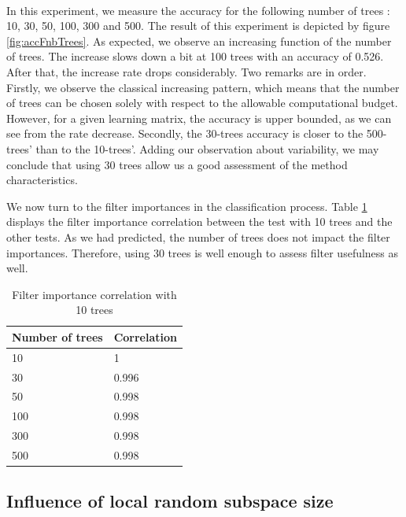 \documentclass[a4paper]{report}
\begin{document}
		\paragraph{}
		In this experiment, we measure the accuracy for the following number of trees : 10, 30, 50, 100, 300 and 500. 
		The result of this experiment is depicted by figure \ref{fig:accFnbTrees}. As expected, we observe an increasing function of the number of trees. The increase slows down a bit at 100 trees with an accuracy of 0.526. After that, the increase rate drops considerably. Two remarks are in order. Firstly, we observe the classical increasing pattern, which means that the number of trees can be chosen solely with respect to the allowable computational budget. However, for a given learning matrix, the accuracy is upper bounded, as we can see from the rate decrease. Secondly, the 30-trees accuracy is closer to the 500-trees' than to the 10-trees'. Adding our observation about variability, we may conclude that using 30 trees allow us a good assessment of the method characteristics. 

		\par
		We now turn to the filter importances in the classification process. Table \ref{tab:CorrVecNbTrees} displays the filter importance correlation between the test with 10 trees and the other tests. As we had predicted, the number of trees does not impact the filter importances. Therefore, using 30 trees is well enough to assess filter usefulness as well.
		
		\begin{table}
			\centering
				\begin{tabular}{l|l}
				\hline
				Number of trees & Correlation \\
				\hline \hline
				10 & 1 \\
				30 & 0.996 \\
				50 & 0.998 \\
				100 & 0.998 \\
				300 & 0.998 \\
				500 & 0.998 \\
				\hline
				\end{tabular}
			\caption{\label{tab:CorrVecNbTrees}Filter importance correlation with 10 trees}
		\end{table}
		
		
		
		
		
		\subsection{Influence of local random subspace size}
		
\end{document}
